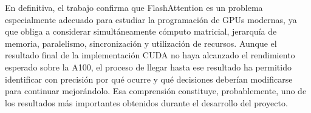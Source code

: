 En definitiva, el trabajo confirma que FlashAttention es un problema especialmente adecuado para estudiar la programación de GPUs modernas, ya que obliga a considerar simultáneamente cómputo matricial, jerarquía de memoria, paralelismo, sincronización y utilización de recursos. Aunque el resultado final de la implementación CUDA no haya alcanzado el rendimiento esperado sobre la A100, el proceso de llegar hasta ese resultado ha permitido identificar con precisión por qué ocurre y qué decisiones deberían modificarse para continuar mejorándolo. Esa comprensión constituye, probablemente, uno de los resultados más importantes obtenidos durante el desarrollo del proyecto.
